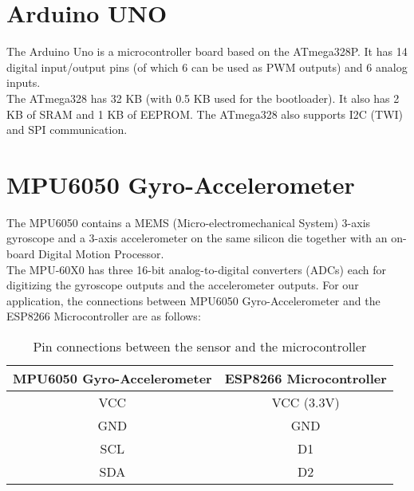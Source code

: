 \documentclass{report}
\begin{document}
\section{Arduino UNO}

The Arduino Uno is a microcontroller board based on the ATmega328P. It has 14 digital input/output pins (of which 6 can be used as PWM outputs) and 6 analog inputs. \\ The ATmega328 has 32 KB (with 0.5 KB used for the bootloader). It also has 2 KB of SRAM and 1 KB of EEPROM. The ATmega328 also supports I2C (TWI) and SPI communication.

\section{MPU6050 Gyro-Accelerometer}

The MPU6050 contains a MEMS (Micro-electromechanical System) 3-axis gyroscope and a 3-axis accelerometer on the same silicon die together with an on-board Digital Motion Processor. \\ The MPU-60X0 has three 16-bit analog-to-digital converters (ADCs) each for digitizing the gyroscope outputs and the accelerometer outputs.
\newpage
For our application, the connections between MPU6050 Gyro-Accelerometer and the ESP8266 Microcontroller are as follows:
\begin{table}[H]
    \centering
    \begin{tabular}{|c|c|}
    \hline
    MPU6050 Gyro-Accelerometer & ESP8266 Microcontroller \\
    \hline
    VCC & VCC (3.3V) \\
    GND & GND \\
    SCL & D1 \\
    SDA & D2 \\
    \hline
\end{tabular}
    \caption{Pin connections between the sensor and the microcontroller}
    \label{tab:pin}
\end{table}
\end{document}
